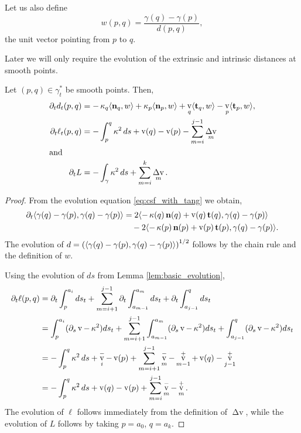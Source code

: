 \documentclass[11pt]{amsart}
\DeclareMathOperator{\tangspeed}{v}
\DeclareMathOperator{\corneranglespeed}{{\Delta v}}
\begin{document}
Let us also define
\begin{equation}
\label{eq:w}
w(p, q) = \frac{\gamma(q) - \gamma(p)}{d(p,q)},
\end{equation}
the unit vector pointing from \(p\) to \(q\).

Later we will only require the evolution of the extrinsic and intrinsic distances at smooth points.

\begin{lemma}
\label{lem:distance_evolution}

Let \((p,q) \in \gamma_t^{\ast}\) be smooth points. Then,
\begin{align*}
\partial_t d_t(p, q) &= -\curvecurv_q \ip{\nor_q}{w} + \curvecurv_p \ip{\nor_p}{w} + \tangspeed_q \ip{\tang_q}{w} - \tangspeed_p \ip{\tang_p}{w}, \\
\partial_t \ell_t(p, q) &= - \int_p^q \curvecurv^2 ds + \tangspeed(q) - \tangspeed(p) - \sum_{m=i}^{j-1} \corneranglespeed_m \\
\intertext{and}
\partial_t L &= - \int_{\gamma} \curvecurv^2 ds + \sum_{m=i}^{k} \corneranglespeed_m.
\end{align*}
\end{lemma}

\begin{proof}
From the evolution equation \eqref{eq:csf_with_tang} we obtain,
\[
\begin{split}
\partial_t \ip{\gamma(q) - \gamma(p)}{\gamma(q) - \gamma(p)} &= 2 \ip{-\curvecurv(q) \nor(q) + \tangspeed(q) \tang(q)}{\gamma(q) - \gamma(p)} \\
&\quad  - 2 \ip{-\curvecurv(p) \nor(p) + \tangspeed(p) \tang(p)}{\gamma(q) - \gamma(p)}.
\end{split}
\]
The evolution of \(d = \left(\langle{\gamma(q) - \gamma(p)},{\gamma(q) - \gamma(p)}\rangle\right)^{1/2}\) follows by the chain rule and the definition of \(w\).

Using the evolution of \(ds\) from Lemma \ref{lem:basic_evolution},
\begin{align*}
\partial_t \ell(p,q) &= \partial_t \int_p^{a_i} ds_t + \sum_{m=i+1}^{j-1} \partial_t \int_{a_{m-1}}^{a_m} ds_t + \partial_t  \int_{a_{j-1}}^q ds_t \\
&= \int_p^{a_i} (\partial_s \tangspeed - \curvecurv^2 )ds_t + \sum_{m=i+1}^{j-1} \int_{a_{m-1}}^{a_m} (\partial_s \tangspeed - \curvecurv^2 )ds_t + \int_{a_{j-1}}^q (\partial_s \tangspeed - \curvecurv^2) ds_t \\
&= -\int_p^q \curvecurv^2 ds + \tangspeed_i^- - \tangspeed(p) + \sum_{m=i+1}^{j-1} \tangspeed_m^- - \tangspeed_{m-1}^+ + \tangspeed(q) - \tangspeed_{j-1}^+ \\
&= -\int_p^q \curvecurv^2 ds + \tangspeed(q) - \tangspeed(p) + \sum_{m=i}^{j-1} \tangspeed_m^- - \tangspeed_m^+.
\end{align*}
The evolution of \(\ell\) follows immediately from the definition of \(\corneranglespeed\), while the evolution of \(L\) follows by taking \(p=a_0\), \(q=a_k\).
\end{proof}
\end{document}
